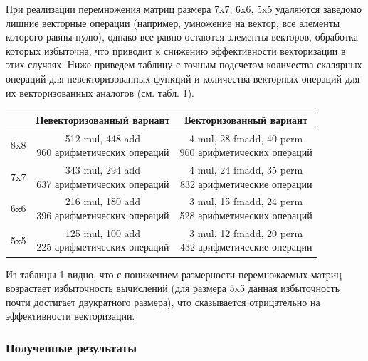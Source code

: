 При реализации перемножения матриц размера 7x7, 6x6, 5x5 удаляются заведомо лишние векторные операции (например, умножение на вектор, все элементы которого равны нулю), однако все равно остаются элементы векторов, обработка которых избыточна, что приводит к снижению эффективности векторизации в этих случаях.
Ниже приведем таблицу с точным подсчетом количества скалярных операций для невекторизованных функций и количества векторных операций для их векторизованных аналогов (см. табл. 1).

\begin{center}
\begin{tabular}{ | c | c | c | }
  \hline
  \ & Невекторизованный вариант & Векторизованный вариант \\ \hline\hline
  8x8 & \makecell{512 mul, 448 add \\ 960 арифметических операций} & \makecell{4 mul, 28 fmadd, 40 perm \\ 960 арифметических операций} \\ \hline
  7x7 & \makecell{343 mul, 294 add \\ 637 арифметических операций} & \makecell{4 mul, 24 fmadd, 35 perm \\ 832 арифметические операции} \\ \hline
  6x6 & \makecell{216 mul, 180 add \\ 396 арифметических операций} & \makecell{3 mul, 15 fmadd, 24 perm \\ 528 арифметических операций} \\ \hline
  5x5 & \makecell{125 mul, 100 add \\ 225 арифметических операций} & \makecell{3 mul, 12 fmadd, 20 perm \\ 432 арифметические операции}
 \\ \hline
\end{tabular}
\end{center}

Из таблицы 1 видно, что с понижением размерности перемножаемых матриц возрастает избыточность вычислений (для размера 5x5 данная избыточность почти достигает двукратного размера), что сказывается отрицательно на эффективности векторизации.

\subsubsection{Полученные результаты}

